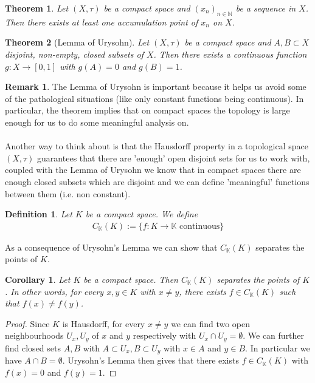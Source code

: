 \documentclass[11pt,a4paper]{article}
\newtheorem{thm}{Theorem}[section]
\newtheorem{cor}{Corollary}[section]
\newtheorem{defn}{Definition}[section]
\theoremstyle{definition}
\newtheorem{rem}{Remark}[section]
\begin{document}
\begin{thm} Let $(X, \tau)$ be a compact space and $(x_n)_{n \in \mathbb{N}}$ be a sequence in $X$. Then there exists at least one accumulation point of $x_n$ on $X$. 
\end{thm}
\begin{thm}[Lemma of Urysohn] Let $(X, \tau)$ be a compact space and $A,B \subset X$ disjoint, non-empty, closed subsets of $X$. Then there exists a continuous function $g: X \to [0,1]$ with $g(A)=0$ and $g(B)=1$. 
\end{thm}
\begin{rem} The Lemma of Urysohn is important because it helps us avoid some of the pathological situations (like only constant functions being continuous). In particular, the theorem implies that on compact spaces the topology is large enough for us to do some meaningful analysis on. \\\\
Another way to think about is that the Hausdorff property in a topological space $(X, \tau)$ guarantees that there are 'enough' open disjoint sets for us to work with, coupled with the Lemma of Urysohn we know that in compact spaces there are enough closed subsets which are disjoint and we can define 'meaningful' functions between them (i.e. non constant). 
\end{rem}
\newpage
\begin{defn} Let $K$ be a compact space. We define
\begin{align*}
C_\mathbb{K}(K):= \lbrace f: K \to \mathbb{K} \text{ continuous}\rbrace
\end{align*}
\end{defn}
\noindent As a consequence of Urysohn's Lemma we can show that $C_\mathbb{K}(K)$ separates the points of $K$. 
\begin{cor} Let $K$ be a compact space. Then $C_\mathbb{K}(K)$ separates the points of $K$. In other words, for every $x,y \in K$ with $x \neq y$, there exists $f \in C_\mathbb{K}(K)$ such that $f(x) \neq f(y)$.
\end{cor}
\begin{proof}
Since $K$ is Hausdorff, for every $x \neq y$ we can find two open neighbourhoods $U_x, U_y$ of $x$ and $y$ respectively with $U_x \cap U_y = \emptyset$. We can further find closed sets $A,B$ with $A \subset U_x, B \subset U_y$ with $x \in A$ and $y \in B$. In particular we have $A \cap B = \emptyset$. Urysohn's Lemma then gives that there exists $f \in C_\mathbb{K}(K)$ with $f(x)=0$ and $f(y)=1$. 
\end{proof}
\end{document}
